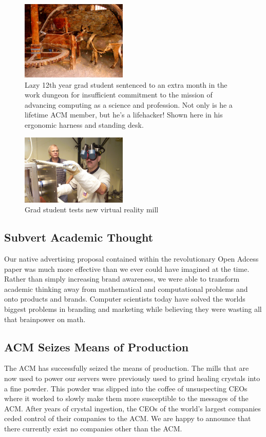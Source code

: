 \begin{figure}
  \centering
  \includegraphics[width=0.45\textwidth]{figures/horse-mill.jpg}
  \caption{Lazy 12th year grad student sentenced to an extra
  month in the work dungeon for insufficient commitment to the mission of advancing
computing as a science and profession.
Not only is he a lifetime ACM member, but he's a lifehacker!  Shown here in his
ergonomic harness and standing desk.}
  \label{fig:horse-mill}
\end{figure}

\begin{figure}
  \centering
  \includegraphics[width=0.45\textwidth]{figures/future-mill.jpg}
  \caption{Grad student tests new virtual reality mill}
  \label{fig:vr-mill}
\end{figure}

\subsection{Subvert Academic Thought}
Our native advertising proposal contained within the revolutionary Open Adcess
\cite{this} paper was much more effective than we ever could have imagined at
the time.
Rather than simply increasing brand awareness, we were able to transform
academic thinking away from mathematical and computational problems and
onto products and brands.
Computer scientists today have solved the worlds biggest problems in branding
and marketing while believing they were wasting all that brainpower on math.

\subsection{ACM Seizes Means of Production}
The ACM has successfully seized the means of production.
The mills that are now used to power our servers were previously used to grind
healing crystals into a fine powder.
This powder was slipped into the coffee of unsuspecting CEOs where it worked to
slowly make them more susceptible to the messages of the ACM.
After years of crystal ingestion, the CEOs of the world's largest companies
ceded control of their companies to the ACM.
We are happy to announce that there currently exist no companies other than the
ACM.

